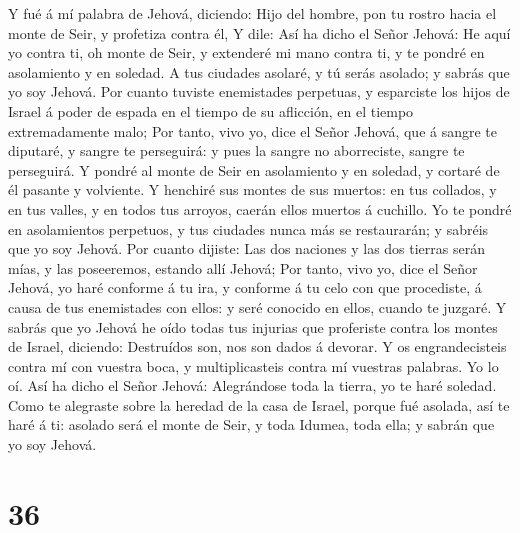  Y fué á mí palabra de Jehová, diciendo: 
Hijo del hombre, pon tu rostro hacia el monte de Seir, y profetiza
contra él,  Y dile: Así ha dicho el Señor Jehová: He aquí
yo contra ti, oh monte de Seir, y extenderé mi mano contra ti, y te
pondré en asolamiento y en soledad.  A tus ciudades
asolaré, y tú serás asolado; y sabrás que yo soy Jehová. 
Por cuanto tuviste enemistades perpetuas, y esparciste los hijos de
Israel á poder de espada en el tiempo de su aflicción, en el tiempo
extremadamente malo;  Por tanto, vivo yo, dice el Señor
Jehová, que á sangre te diputaré, y sangre te perseguirá: y pues la
sangre no aborreciste, sangre te perseguirá.  Y pondré al
monte de Seir en asolamiento y en soledad, y cortaré de él pasante y
volviente.  Y henchiré sus montes de sus muertos: en tus
collados, y en tus valles, y en todos tus arroyos, caerán ellos muertos
á cuchillo.  Yo te pondré en asolamientos perpetuos, y tus
ciudades nunca más se restaurarán; y sabréis que yo soy Jehová.
 Por cuanto dijiste: Las dos naciones y las dos tierras
serán mías, y las poseeremos, estando allí Jehová;  Por
tanto, vivo yo, dice el Señor Jehová, yo haré conforme á tu ira, y
conforme á tu celo con que procediste, á causa de tus enemistades con
ellos: y seré conocido en ellos, cuando te juzgaré.  Y
sabrás que yo Jehová he oído todas tus injurias que proferiste contra
los montes de Israel, diciendo: Destruídos son, nos son dados á devorar.
 Y os engrandecisteis contra mí con vuestra boca, y
multiplicasteis contra mí vuestras palabras. Yo lo oí. 
Así ha dicho el Señor Jehová: Alegrándose toda la tierra, yo te haré
soledad.  Como te alegraste sobre la heredad de la casa
de Israel, porque fué asolada, así te haré á ti: asolado será el monte
de Seir, y toda Idumea, toda ella; y sabrán que yo soy Jehová.

\hypertarget{section-35}{%
\section{36}\label{section-35}}


